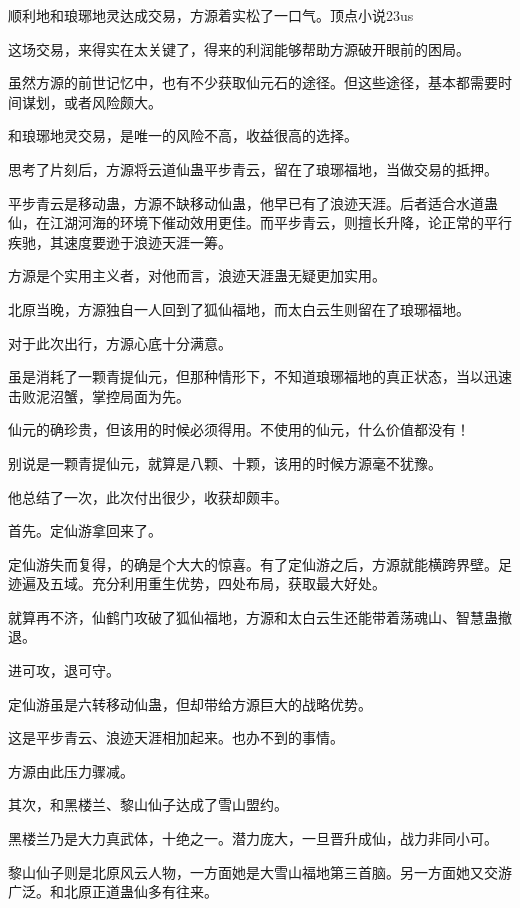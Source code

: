
\begin{this_body}

顺利地和琅琊地灵达成交易，方源着实松了一口气。顶点小说23us

这场交易，来得实在太关键了，得来的利润能够帮助方源破开眼前的困局。

虽然方源的前世记忆中，也有不少获取仙元石的途径。但这些途径，基本都需要时间谋划，或者风险颇大。

和琅琊地灵交易，是唯一的风险不高，收益很高的选择。

思考了片刻后，方源将云道仙蛊平步青云，留在了琅琊福地，当做交易的抵押。

平步青云是移动蛊，方源不缺移动仙蛊，他早已有了浪迹天涯。后者适合水道蛊仙，在江湖河海的环境下催动效用更佳。而平步青云，则擅长升降，论正常的平行疾驰，其速度要逊于浪迹天涯一筹。

方源是个实用主义者，对他而言，浪迹天涯蛊无疑更加实用。

北原当晚，方源独自一人回到了狐仙福地，而太白云生则留在了琅琊福地。

对于此次出行，方源心底十分满意。

虽是消耗了一颗青提仙元，但那种情形下，不知道琅琊福地的真正状态，当以迅速击败泥沼蟹，掌控局面为先。

仙元的确珍贵，但该用的时候必须得用。不使用的仙元，什么价值都没有！

别说是一颗青提仙元，就算是八颗、十颗，该用的时候方源毫不犹豫。

他总结了一次，此次付出很少，收获却颇丰。

首先。定仙游拿回来了。

定仙游失而复得，的确是个大大的惊喜。有了定仙游之后，方源就能横跨界壁。足迹遍及五域。充分利用重生优势，四处布局，获取最大好处。

就算再不济，仙鹤门攻破了狐仙福地，方源和太白云生还能带着荡魂山、智慧蛊撤退。

进可攻，退可守。

定仙游虽是六转移动仙蛊，但却带给方源巨大的战略优势。

这是平步青云、浪迹天涯相加起来。也办不到的事情。

方源由此压力骤减。

其次，和黑楼兰、黎山仙子达成了雪山盟约。

黑楼兰乃是大力真武体，十绝之一。潜力庞大，一旦晋升成仙，战力非同小可。

黎山仙子则是北原风云人物，一方面她是大雪山福地第三首脑。另一方面她又交游广泛。和北原正道蛊仙多有往来。


\end{this_body}

